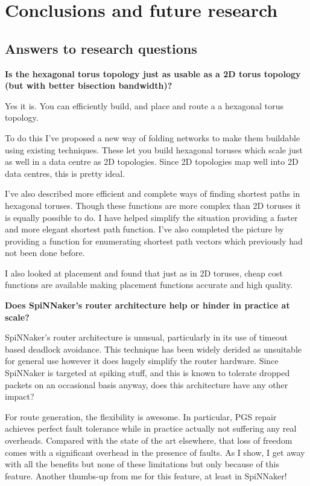 \chapter{Conclusions and future research}
	
	\section{Answers to research questions}
		
		\textbf{Is the hexagonal torus topology just as usable as a 2D torus topology
		(but with better bisection bandwidth)?}
		
		Yes it is. You can efficiently build, and place and route a a hexagonal
		torus topology.
		
		To do this I've proposed a new way of folding networks to make them
		buildable using existing techniques. These let you build hexagonal toruses
		which scale just as well in a data centre as 2D topologies. Since 2D
		topologies map well into 2D data centres, this is pretty ideal.
		
		I've also described more efficient and complete ways of finding shortest
		paths in hexagonal toruses. Though these functions are more complex than 2D
		toruses it is equally possible to do. I have helped simplify the situation
		providing a faster and more elegant shortest path function. I've also
		completed the picture by providing a function for enumerating shortest path
		vectors which previously had not been done before.
		
		I also looked at placement and found that just as in 2D toruses, cheap cost
		functions are available making placement functions accurate and high
		quality.
		
		\textbf{Does SpiNNaker's router architecture help or hinder in practice at
		scale?}
		
		SpiNNaker's router architecture is unusual, particularly in its use of
		timeout based deadlock avoidance. This technique has been widely derided
		as unsuitable for general use however it does hugely simplify the router
		hardware. Since SpiNNaker is targeted at spiking stuff, and this is known
		to tolerate dropped packets on an occasional basis anyway, does this
		architecture have any other impact?
		
		For route generation, the flexibility is awesome. In particular, PGS repair
		achieves perfect fault tolerance while in practice actually not suffering
		any real overheads. Compared with the state of the art elsewhere, that loss
		of freedom comes with a significant overhead in the presence of faults. As
		I show, I get away with all the benefits but none of these limitations but
		only because of this feature. Another thumbs-up from me for this feature,
		at least in SpiNNaker!
		

